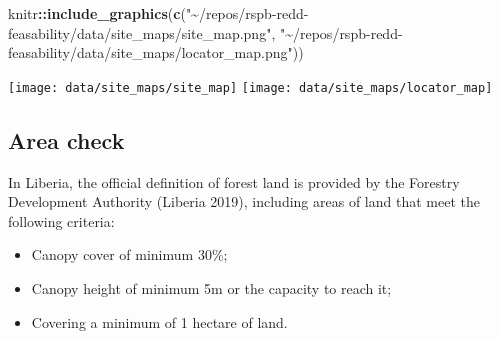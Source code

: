 \documentclass[
]{article}
\newenvironment{Shaded}{\begin{snugshade}}{\end{snugshade}}
\newcommand{\DecValTok}[1]{\textcolor[rgb]{0.00,0.00,0.81}{#1}}
\newcommand{\FloatTok}[1]{\textcolor[rgb]{0.00,0.00,0.81}{#1}}
\newcommand{\FunctionTok}[1]{\textcolor[rgb]{0.13,0.29,0.53}{\textbf{#1}}}
\newcommand{\NormalTok}[1]{#1}
\newcommand{\OtherTok}[1]{\textcolor[rgb]{0.56,0.35,0.01}{#1}}
\newcommand{\SpecialCharTok}[1]{\textcolor[rgb]{0.81,0.36,0.00}{\textbf{#1}}}
\newcommand{\StringTok}[1]{\textcolor[rgb]{0.31,0.60,0.02}{#1}}
\providecommand{\tightlist}{%
  \setlength{\itemsep}{0pt}\setlength{\parskip}{0pt}}
\begin{document}
\begin{Shaded}
\begin{Highlighting}[]
\NormalTok{knitr}\SpecialCharTok{::}\FunctionTok{include\_graphics}\NormalTok{(}\FunctionTok{c}\NormalTok{(}\StringTok{"\textasciitilde{}/repos/rspb{-}redd{-}feasability/data/site\_maps/site\_map.png"}\NormalTok{,}
                          \StringTok{"\textasciitilde{}/repos/rspb{-}redd{-}feasability/data/site\_maps/locator\_map.png"}\NormalTok{))}
\end{Highlighting}
\end{Shaded}

\texttt{[image: data/site\_maps/site\_map]}
\texttt{[image: data/site\_maps/locator\_map]}

\subsection{Area check}\label{area-check}

In Liberia, the official definition of forest land is provided by the
Forestry Development Authority (Liberia 2019), including areas of land
that meet the following criteria:

\begin{itemize}
\tightlist
\item
  Canopy cover of minimum 30\%;
\item
  Canopy height of minimum 5m or the capacity to reach it;
\item
  Covering a minimum of 1 hectare of land.
\end{itemize}

\begin{Shaded}
\end{Shaded}
\end{document}
